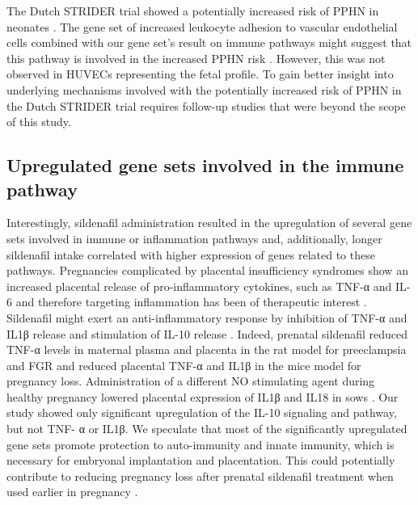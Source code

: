 \documentclass[authordate, empirical]{jote-new-article}
\begin{document}
	The Dutch STRIDER trial showed a potentially increased risk of PPHN in neonates \parencites{Pels2020}. The gene set of increased leukocyte adhesion to vascular endothelial cells combined with our gene set's result on immune pathways might suggest that this pathway is involved in the increased PPHN risk \parencites{Rafikov2019}{Kuebler2018} {ElChami2012}{Kobayashi2004}. However, this was not observed in HUVECs representing the fetal profile. To gain better insight into underlying mechanisms involved with the potentially increased risk of PPHN in the Dutch STRIDER trial requires follow-up studies that were beyond the scope of this study.







	\subsection{Upregulated gene sets involved in the immune pathway }



Interestingly, sildenafil administration resulted in the upregulation of several gene sets involved in immune or inflammation pathways and, additionally, longer sildenafil intake correlated with higher expression of genes related to these pathways. Pregnancies complicated by placental insufficiency syndromes show an increased placental release of pro-inflammatory cytokines, such as TNF-α and IL-6 and therefore targeting inflammation has been of therapeutic interest \parencites{George2011}{Oyston2015}{Kniotek2017}. Sildenafil might exert an anti-inflammatory response by inhibition of TNF-α and IL1β release and stimulation of IL-10 release \parencites{Ribaudo2016}{Kniotek2017}. Indeed, prenatal sildenafil reduced TNF-α levels in maternal plasma and placenta in the rat model for preeclampsia and FGR \parencites{Gillis2016} and reduced placental TNF-α and IL1β in the mice model for pregnancy loss. Administration of a different NO stimulating agent during healthy pregnancy lowered placental expression of IL1β and IL18 in sows \parencites{Luo2019}. Our study showed only significant upregulation of the IL-10 signaling and pathway, but not TNF- α or IL1β. We speculate that most of the significantly upregulated gene sets promote protection to auto-immunity and innate immunity, which is necessary for embryonal implantation and placentation. This could potentially contribute to reducing pregnancy loss after prenatal sildenafil treatment when used earlier in pregnancy \parencites{Luna2015}.
\end{document}
